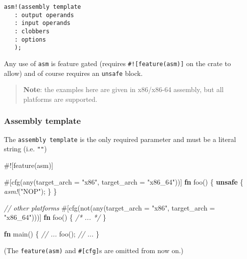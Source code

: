 \documentclass[a4paper,]{book}
\newenvironment{Shaded}{\begin{snugshade}}{\end{snugshade}}
\newcommand{\KeywordTok}[1]{\textcolor[rgb]{0.13,0.29,0.53}{\textbf{{#1}}}}
\newcommand{\StringTok}[1]{\textcolor[rgb]{0.31,0.60,0.02}{{#1}}}
\newcommand{\CommentTok}[1]{\textcolor[rgb]{0.56,0.35,0.01}{\textit{{#1}}}}
\newcommand{\PreprocessorTok}[1]{\textcolor[rgb]{0.56,0.35,0.01}{\textit{{#1}}}}
\newcommand{\AttributeTok}[1]{\textcolor[rgb]{0.77,0.63,0.00}{{#1}}}
\newcommand{\NormalTok}[1]{{#1}}
\begin{document}
\begin{verbatim}
asm!(assembly template
   : output operands
   : input operands
   : clobbers
   : options
   );
\end{verbatim}

Any use of \texttt{asm} is feature gated (requires
\texttt{\#!{[}feature(asm){]}} on the crate to allow) and of course
requires an \texttt{unsafe} block.

\begin{quote}
\textbf{Note}: the examples here are given in x86/x86-64 assembly, but
all platforms are supported.
\end{quote}

\subsubsection{Assembly template}\label{assembly-template}

The \texttt{assembly\ template} is the only required parameter and must
be a literal string (i.e. \texttt{""})

\begin{Shaded}
\begin{Highlighting}[]
\AttributeTok{#![}\NormalTok{feature}\AttributeTok{(}\NormalTok{asm}\AttributeTok{)]}

\AttributeTok{#[}\NormalTok{cfg}\AttributeTok{(}\NormalTok{any}\AttributeTok{(}\NormalTok{target_arch }\AttributeTok{=} \StringTok{"x86"}\AttributeTok{,} \NormalTok{target_arch }\AttributeTok{=} \StringTok{"x86_64"}\AttributeTok{))]}
\KeywordTok{fn} \NormalTok{foo() \{}
    \KeywordTok{unsafe} \NormalTok{\{}
        \PreprocessorTok{asm!}\NormalTok{(}\StringTok{"NOP"}\NormalTok{);}
    \NormalTok{\}}
\NormalTok{\}}

\CommentTok{// other platforms}
\AttributeTok{#[}\NormalTok{cfg}\AttributeTok{(}\NormalTok{not}\AttributeTok{(}\NormalTok{any}\AttributeTok{(}\NormalTok{target_arch }\AttributeTok{=} \StringTok{"x86"}\AttributeTok{,} \NormalTok{target_arch }\AttributeTok{=} \StringTok{"x86_64"}\AttributeTok{)))]}
\KeywordTok{fn} \NormalTok{foo() \{ }\CommentTok{/* ... */} \NormalTok{\}}

\KeywordTok{fn} \NormalTok{main() \{}
    \CommentTok{// ...}
    \NormalTok{foo();}
    \CommentTok{// ...}
\NormalTok{\}}
\end{Highlighting}
\end{Shaded}

(The \texttt{feature(asm)} and \texttt{\#{[}cfg{]}}s are omitted from
now on.)
\end{document}
